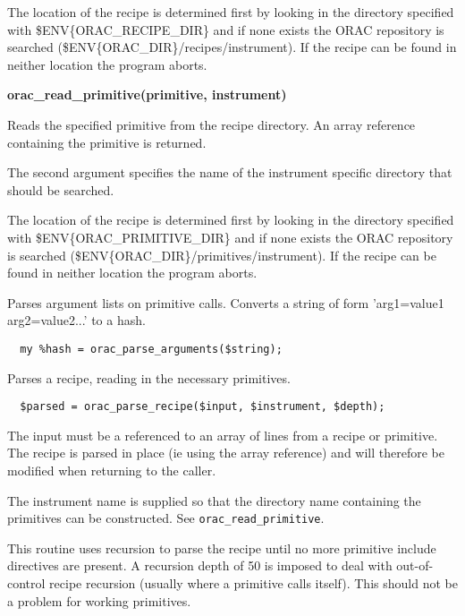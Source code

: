 \begin{description}
The location of the recipe is determined first by looking in the
directory specified with \$ENV\{ORAC\_RECIPE\_DIR\} and if none exists
the ORAC repository is searched (\$ENV\{ORAC\_DIR\}/recipes/instrument).
If the recipe can be found in neither location the program aborts.

\item \textbf{\textbf{orac\_read\_primitive}(primitive, instrument)}

Reads the specified primitive from the recipe directory.
An array reference containing the primitive is returned.



The second argument specifies the name of the instrument specific
directory that should be searched.



The location of the recipe is determined first by looking in the
directory specified with \$ENV\{ORAC\_PRIMITIVE\_DIR\} and if none exists
the ORAC repository is searched (\$ENV\{ORAC\_DIR\}/primitives/instrument).
If the recipe can be found in neither location the program aborts.

\item[\textbf{orac\_parse\_arguments}(line)] \mbox{}

Parses argument lists on primitive calls.
Converts a string of form 'arg1=value1 arg2=value2...'
to a hash.

\begin{verbatim}
  my %hash = orac_parse_arguments($string);
\end{verbatim}
\item[\textbf{orac\_parse\_recipe}] \mbox{}

Parses a recipe, reading in the necessary primitives.

\begin{verbatim}
  $parsed = orac_parse_recipe($input, $instrument, $depth);
\end{verbatim}


The input must be a referenced to an array of lines from a recipe or
primitive. The recipe is parsed in place (ie using the array
reference) and will therefore be modified when returning to the
caller.



The instrument name is supplied so that the directory name containing
the primitives can be constructed. See \texttt{orac\_read\_primitive}.



This routine uses recursion to parse the recipe until no more
primitive include directives are present. A recursion depth
of 50 is imposed to deal with out-of-control recipe recursion
(usually where a primitive calls itself). This should not be a
problem for working primitives.




\end{description}
